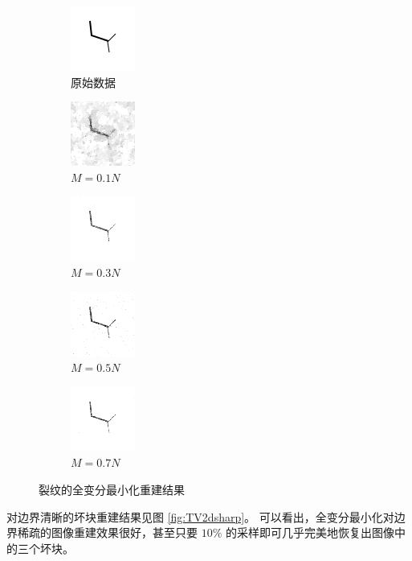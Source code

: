 \begin{figure}
\centering
\begin{subfigure}[t]{1.1in}
	\includegraphics{Figure/testdata/1d.png}
	\caption{原始数据}
\end{subfigure}
\begin{subfigure}[t]{1.1in}
	\includegraphics{Figure/TV/1d10.png}
	\caption{$M = 0.1 N$}
\end{subfigure}
\begin{subfigure}[t]{1.1in}
	\includegraphics{Figure/TV/1d30.png}
	\caption{$M = 0.3 N$}
\end{subfigure}
\begin{subfigure}[t]{1.1in}
	\includegraphics{Figure/TV/1d50.png}
	\caption{$M = 0.5 N$}
\end{subfigure}
\begin{subfigure}[t]{1.1in}
	\includegraphics{Figure/TV/1d70.png}
	\caption{$M = 0.7 N$}
\end{subfigure}
\caption{裂纹的全变分最小化重建结果}
\label{fig:TV1d}
\end{figure}

对边界清晰的坏块重建结果见图 \ref{fig:TV2dsharp}。
可以看出，全变分最小化对边界稀疏的图像重建效果很好，甚至只要
$10\%$ 的采样即可几乎完美地恢复出图像中的三个坏块。

